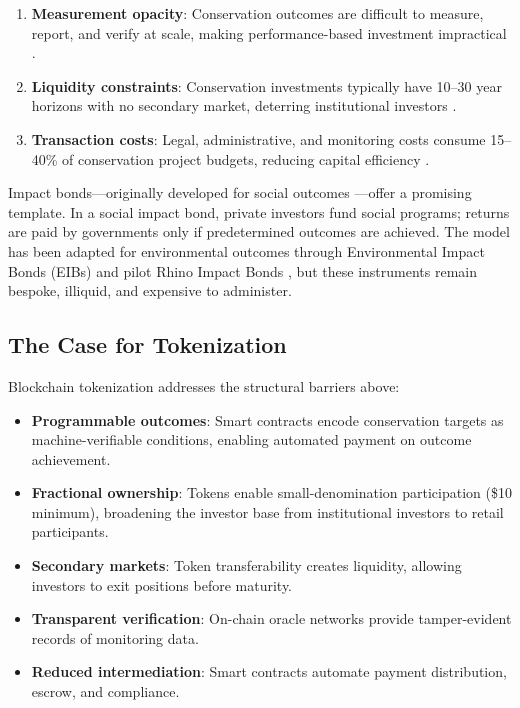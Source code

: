 \documentclass[11pt,a4paper]{article}
\begin{document}
\begin{enumerate}[label=(\roman*)]
  \item \textbf{Measurement opacity}: Conservation outcomes are
    difficult to measure, report, and verify at scale, making
    performance-based investment impractical \citep{zu2022biodiversity}.
  \item \textbf{Liquidity constraints}: Conservation investments
    typically have 10--30 year horizons with no secondary market,
    deterring institutional investors \citep{huwyler2014making}.
  \item \textbf{Transaction costs}: Legal, administrative, and
    monitoring costs consume 15--40\% of conservation project budgets,
    reducing capital efficiency \citep{deutz2020financing}.
\end{enumerate}

Impact bonds---originally developed for social outcomes
\citep{liebman2011social}---offer a promising template. In a social
impact bond, private investors fund social programs; returns are paid by
governments only if predetermined outcomes are achieved. The model has
been adapted for environmental outcomes through Environmental Impact
Bonds (EIBs) \citep{nicola2013quantifying} and pilot Rhino Impact Bonds
\citep{uct2020rhino}, but these instruments remain bespoke, illiquid,
and expensive to administer.

\subsection{The Case for Tokenization}

Blockchain tokenization addresses the structural barriers above:

\begin{itemize}
  \item \textbf{Programmable outcomes}: Smart contracts encode
    conservation targets as machine-verifiable conditions, enabling
    automated payment on outcome achievement.
  \item \textbf{Fractional ownership}: Tokens enable small-denomination
    participation (\$10 minimum), broadening the investor base from
    institutional investors to retail participants.
  \item \textbf{Secondary markets}: Token transferability creates
    liquidity, allowing investors to exit positions before maturity.
  \item \textbf{Transparent verification}: On-chain oracle networks
    provide tamper-evident records of monitoring data.
  \item \textbf{Reduced intermediation}: Smart contracts automate
    payment distribution, escrow, and compliance.
\end{itemize}
\end{document}
